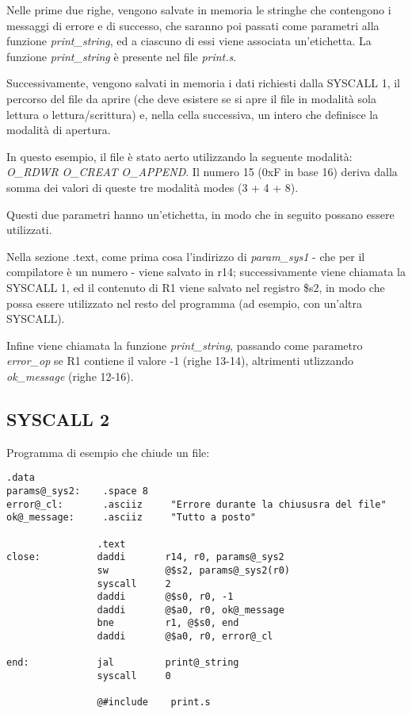 \documentclass[letterpaper,10pt,english]{sphinxmanual}
\begin{document}
Nelle prime due righe, vengono salvate in memoria le stringhe che contengono
i messaggi di errore e di successo, che saranno poi passati come parametri
alla funzione \emph{print\_string}, ed a ciascuno di essi viene associata
un'etichetta. La funzione \emph{print\_string} è presente nel file \emph{print.s}.

Successivamente, vengono salvati in memoria i dati richiesti dalla SYSCALL 1,
il percorso del file da aprire (che deve esistere se si apre il file in
modalità sola lettura o lettura/scrittura) e, nella cella successiva, un
intero che definisce la modalità di apertura.

In questo esempio, il file è stato aerto utilizzando la seguente modalità:
\emph{O\_RDWR} \textbar{} \emph{O\_CREAT} \textbar{} \emph{O\_APPEND}. Il numero 15 (0xF in base 16) deriva dalla
somma dei valori di queste tre modalità modes (3 + 4 + 8).

Questi due parametri hanno un'etichetta, in modo che in seguito possano essere
utilizzati.

Nella sezione .text, come prima cosa l'indirizzo di \emph{param\_sys1} - che per il
compilatore è un numero - viene salvato in r14; successivamente viene chiamata
la SYSCALL 1, ed il contenuto di R1 viene salvato nel registro \$s2, in modo
che possa essere utilizzato nel resto del programma (ad esempio, con un'altra
SYSCALL).

Infine viene chiamata la funzione \emph{print\_string}, passando come parametro
\emph{error\_op} se R1 contiene il valore -1 (righe 13-14), altrimenti utlizzando
\emph{ok\_message} (righe 12-16).


\subsection{SYSCALL 2}
\label{examples:syscall-2}
Programma di esempio che chiude un file:

\begin{Verbatim}[commandchars=@\[\]]
                .data
params@_sys2:    .space 8
error@_cl:       .asciiz     "Errore durante la chiususra del file"
ok@_message:     .asciiz     "Tutto a posto"

                .text
close:          daddi       r14, r0, params@_sys2
                sw          @$s2, params@_sys2(r0)
                syscall     2
                daddi       @$s0, r0, -1
                daddi       @$a0, r0, ok@_message
                bne         r1, @$s0, end
                daddi       @$a0, r0, error@_cl

end:            jal         print@_string
                syscall     0

                @#include    print.s
\end{Verbatim}
\end{document}
